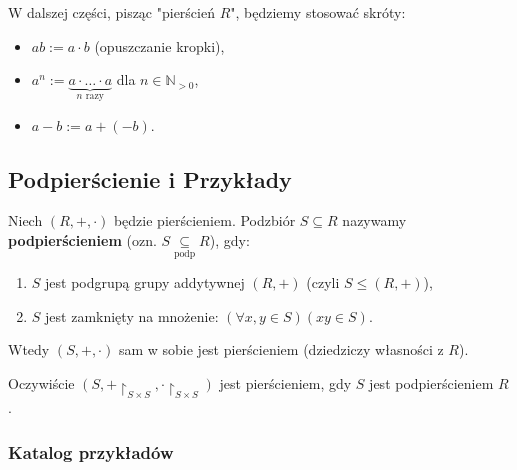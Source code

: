 \begin{remark}
    W dalszej części, pisząc "pierścień $R$", będziemy stosować skróty:
    \begin{itemize}
        \item $ab := a \cdot b$ (opuszczanie kropki),
        \item $a^n := \underbrace{a \cdot \ldots \cdot a}_{n \text{ razy}}$ dla $n \in \mathbb{N}_{>0}$,
        \item $a - b := a + (-b)$.
    \end{itemize}
\end{remark}

\subsection*{Podpierścienie i Przykłady}

\begin{definition}[Podpierścień]
    Niech $(R, +, \cdot)$ będzie pierścieniem. Podzbiór $S \subseteq R$ nazywamy \textbf{podpierścieniem} (ozn. $S \underset{\text{podp}}{\subseteq} R$), gdy:
    \begin{enumerate}
        \item $S$ jest podgrupą grupy addytywnej $(R, +)$ (czyli $S \le (R,+)$),
        \item $S$ jest zamknięty na mnożenie: $(\forall x,y \in S)(xy \in S)$.
    \end{enumerate}
    Wtedy $(S, +, \cdot)$ sam w sobie jest pierścieniem (dziedziczy własności z $R$).
\end{definition}
\begin{remark}
Oczywiście $(S, +\restriction_{\scriptscriptstyle S\times S}, \cdot\restriction_{\scriptscriptstyle S\times S})$ jest pierścieniem, gdy $S$ jest podpierścieniem $R$.
\end{remark} 

\subsubsection*{Katalog przykładów}


